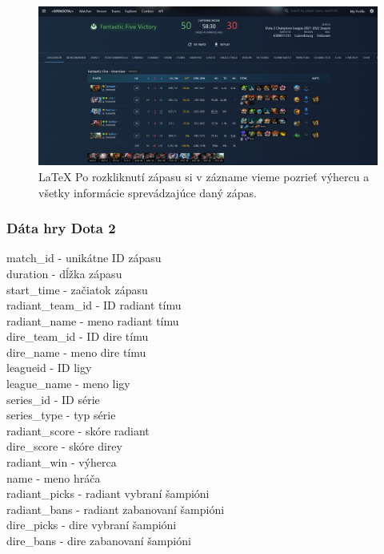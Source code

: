  \begin{figure}[h!]
	
	\includegraphics[width=.9\textwidth]{figures/dota2}
	\centering
	\caption{\LaTeX{} Po rozkliknutí zápasu si v zázname vieme pozrieť výhercu a všetky informácie sprevádzajúce daný zápas. \label{dota2}}
	
\end{figure}

\subsubsection{Dáta hry Dota 2}

match\_id - unikátne ID zápasu \\
duration - dĺžka zápasu \\
start\_time - začiatok zápasu \\
radiant\_team\_id - ID radiant tímu \\
radiant\_name - meno radiant tímu \\
dire\_team\_id - ID dire tímu \\
dire\_name - meno dire tímu \\
leagueid - ID ligy\\
league\_name - meno ligy\\
series\_id - ID série\\
series\_type - typ série\\
radiant\_score - skóre radiant\\
dire\_score - skóre direy\\
radiant\_win - výherca\\
name - meno hráča\\
radiant\_picks - radiant vybraní šampióni\\
radiant\_bans - radiant zabanovaní šampióni\\
dire\_picks - dire vybraní šampióni\\
dire\_bans - dire zabanovaní šampióni


